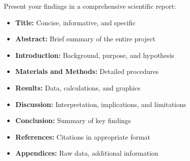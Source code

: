 \documentclass[justified,notoc]{tufte-book}
\begin{document}
Present your findings in a comprehensive scientific report:
\begin{itemize}
    \item \textbf{Title:} Concise, informative, and specific
    \item \textbf{Abstract:} Brief summary of the entire project
    \item \textbf{Introduction:} Background, purpose, and hypothesis
    \item \textbf{Materials and Methods:} Detailed procedures
    \item \textbf{Results:} Data, calculations, and graphics
    \item \textbf{Discussion:} Interpretation, implications, and limitations
    \item \textbf{Conclusion:} Summary of key findings
    \item \textbf{References:} Citations in appropriate format
    \item \textbf{Appendices:} Raw data, additional information
\end{itemize}
\end{document}
